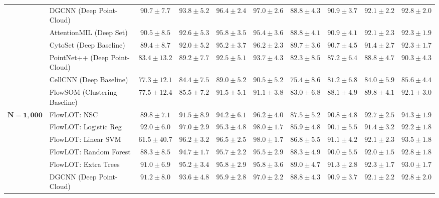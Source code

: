\documentclass[10pt]{article}
\begin{document}
\begin{table}[p]
\begin{tabular}{ll cccc cccc}
 & DGCNN (Deep Point-Cloud) & $90.7 \pm 7.7$ & $93.8 \pm 5.2$ & $\mathbf{96.4 \pm 2.4}$ & $97.0 \pm 2.6$ & $88.8 \pm 4.3$ & $90.9 \pm 3.7$ & $92.1 \pm 2.2$ & $92.8 \pm 2.0$ \\
 & AttentionMIL (Deep Set) & $90.5 \pm 8.5$ & $92.6 \pm 5.3$ & $95.8 \pm 3.5$ & $95.4 \pm 3.6$ & $88.8 \pm 4.1$ & $90.9 \pm 4.1$ & $92.1 \pm 2.3$ & $92.3 \pm 1.9$ \\
 & CytoSet (Deep Baseline) & $89.4 \pm 8.7$ & $92.0 \pm 5.2$ & $95.2 \pm 3.7$ & $96.2 \pm 2.3$ & $\mathbf{89.7 \pm 3.6}$ & $90.7 \pm 4.5$ & $91.4 \pm 2.7$ & $92.3 \pm 1.7$ \\
 & PointNet++ (Deep Point-Cloud) & $83.4 \pm 13.2$ & $89.2 \pm 7.7$ & $92.5 \pm 5.1$ & $93.7 \pm 4.3$ & $82.3 \pm 8.5$ & $87.2 \pm 6.4$ & $88.8 \pm 4.7$ & $90.3 \pm 4.3$ \\
 & CellCNN (Deep Baseline) & $77.3 \pm 12.1$ & $84.4 \pm 7.5$ & $89.0 \pm 5.2$ & $90.5 \pm 5.2$ & $75.4 \pm 8.6$ & $81.2 \pm 6.8$ & $84.0 \pm 5.9$ & $85.6 \pm 4.4$ \\
 & FlowSOM (Clustering Baseline) & $77.5 \pm 12.4$ & $85.5 \pm 7.2$ & $91.5 \pm 5.1$ & $91.1 \pm 3.8$ & $83.0 \pm 6.8$ & $88.1 \pm 4.9$ & $89.8 \pm 4.1$ & $92.1 \pm 3.0$ \\
\midrule
\multirow{11}{*}{$\mathbf{N = 1,000}$} & FlowLOT: NSC & $89.8 \pm 7.1$ & $91.5 \pm 8.9$ & $94.2 \pm 6.1$ & $96.2 \pm 4.0$ & $87.5 \pm 5.2$ & $90.8 \pm 4.8$ & $\mathbf{92.7 \pm 2.5}$ & $\mathbf{94.3 \pm 1.9}$ \\
 & FlowLOT: Logistic Reg & $\mathbf{92.0 \pm 6.0}$ & $\mathbf{97.0 \pm 2.9}$ & $95.3 \pm 4.8$ & $\mathbf{98.0 \pm 1.7}$ & $85.9 \pm 4.8$ & $90.1 \pm 5.5$ & $91.4 \pm 3.2$ & $92.2 \pm 1.8$ \\
 & FlowLOT: Linear SVM & $61.5 \pm 40.7$ & $96.2 \pm 3.2$ & $\mathbf{96.5 \pm 2.5}$ & $\mathbf{98.0 \pm 1.7}$ & $86.8 \pm 5.5$ & $91.1 \pm 4.2$ & $92.1 \pm 2.3$ & $93.5 \pm 1.8$ \\
 & FlowLOT: Random Forest & $88.3 \pm 8.5$ & $94.7 \pm 1.7$ & $95.7 \pm 2.2$ & $95.5 \pm 2.9$ & $88.3 \pm 4.9$ & $90.0 \pm 5.5$ & $92.0 \pm 1.5$ & $92.8 \pm 1.8$ \\
 & FlowLOT: Extra Trees & $91.0 \pm 6.9$ & $95.2 \pm 3.4$ & $95.8 \pm 2.9$ & $95.8 \pm 3.6$ & $89.0 \pm 4.7$ & $\mathbf{91.3 \pm 2.8}$ & $92.3 \pm 1.7$ & $93.0 \pm 1.7$ \\
 & DGCNN (Deep Point-Cloud) & $91.2 \pm 8.0$ & $93.6 \pm 4.8$ & $95.9 \pm 2.8$ & $97.0 \pm 2.2$ & $88.8 \pm 4.3$ & $90.9 \pm 3.7$ & $92.1 \pm 2.2$ & $92.8 \pm 2.0$ \\

\end{tabular}
\end{table}
\end{document}
